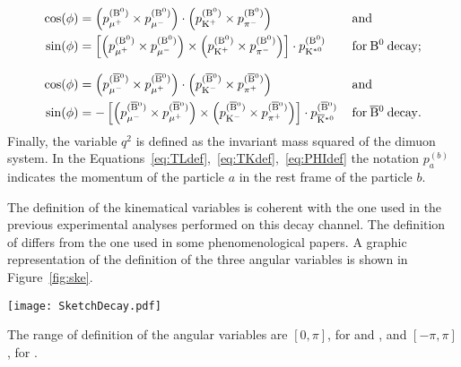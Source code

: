 \begin{equation} \label{eq:PHIdef}
  \begin{aligned}
    \cos(\phi) &= \left( p_{\mu^{+}}^{({\textrm{B}}{}^{0})} \times p_{\mu^{-}}^{({\textrm{B}}{}^{0})} \right) \cdot \left( p_{\textrm{K}^{+}}^{({\textrm{B}}{}^{0})} \times p_{\pi^{-}}^{({\textrm{B}}{}^{0})} \right) \, && \mathrm{and} \\
    \sin(\phi) &= \left[ \left( p_{\mu^{+}}^{({\textrm{B}}{}^{0})} \times p_{\mu^{-}}^{({\textrm{B}}{}^{0})} \right) \times \left( p_{\textrm{K}^{+}}^{({\textrm{B}}{}^{0})} \times p_{\pi^{-}}^{({\textrm{B}}{}^{0})} \right) \right] \cdot p_{\textrm{K}^{\ast0}}^{({\textrm{B}}{}^{0})}\, && \mathrm{for}\:{\textrm{B}}{}^{0}\:\mathrm{decay;} \\[8pt]
    \cos(\phi) &= \left( p_{\mu^{-}}^{(\overline{\textrm{B}}{}^{0})} \times p_{\mu^{+}}^{(\overline{\textrm{B}}{}^{0})} \right) \cdot \left( p_{\textrm{K}^{-}}^{(\overline{\textrm{B}}{}^{0})} \times p_{\pi^{+}}^{(\overline{\textrm{B}}{}^{0})} \right) \, && \mathrm{and} \\
    \sin(\phi) &=-\left[ \left( p_{\mu^{-}}^{(\overline{\textrm{B}}{}^{0})} \times p_{\mu^{+}}^{(\overline{\textrm{B}}{}^{0})} \right) \times \left( p_{\textrm{K}^{-}}^{(\overline{\textrm{B}}{}^{0})} \times p_{\pi^{+}}^{(\overline{\textrm{B}}{}^{0})} \right) \right] \cdot p_{\overline{\textrm{K}}{}^{\ast0}}^{(\overline{\textrm{B}}{}^{0})}\, && \mathrm{for}\:\overline{\textrm{B}}{}^{0}\:\mathrm{decay.} \\
  \end{aligned}
\end{equation}
Finally, the variable $q^2$ is defined as the invariant mass squared of the dimuon system.
In the Equations~\ref{eq:TLdef},~\ref{eq:TKdef},~\ref{eq:PHIdef} the notation $p_a^{(b)}$ indicates the momentum of the particle $a$ in the rest frame of the particle $b$.

The definition of the kinematical variables is coherent with the one used in the previous experimental analyses performed on this decay channel.
The definition of \TL differs from the one used in some phenomenological papers.
A graphic representation of the definition of the three angular variables is shown in Figure~\ref{fig:ske}.

\begin{figure*}[tb]
  \begin{center}
    \texttt{[image: SketchDecay.pdf]}
    \caption{Illustration of the angular variables \TL (left), \TK (middle), and \PHI (right) for the decay \BtoKstmumudecay.}
    \label{fig:ske}
  \end{center}
\end{figure*}

The range of definition of the angular variables are $\left[0,\pi\right]$, for \TL and \TK, and $\left[-\pi,\pi\right]$, for \PHI.


